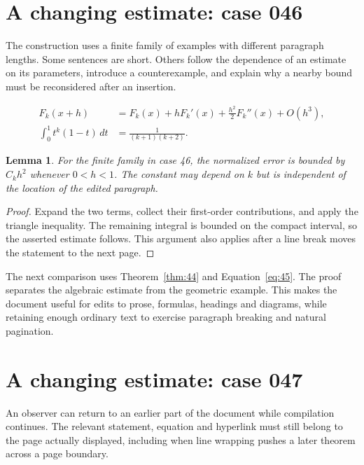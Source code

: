 \documentclass[a4paper,10pt]{article}
\newtheorem{lemma}[theorem]{Lemma}
\begin{document}
\lipsum[23]

\section{A changing estimate: case 046}\label{unit:45}
The construction uses a finite family of examples with different paragraph lengths. Some sentences are short. Others follow the dependence of an estimate on its parameters, introduce a counterexample, and explain why a nearby bound must be reconsidered after an insertion.

\lipsum[16-17]
\begin{align}\label{eq:45}
 F_k(x+h)&=F_k(x)+hF_k'(x)+\frac{h^2}{2}F_k''(x)+O(h^3),\\
 \int_0^1 t^k(1-t)\,dt&=\frac{1}{(k+1)(k+2)}.
\end{align}
\begin{lemma}\label{thm:45}
For the finite family in case 46, the normalized error is bounded by $C_k h^2$ whenever $0<h<1$. The constant may depend on $k$ but is independent of the location of the edited paragraph.
\end{lemma}
\begin{proof}
Expand the two terms, collect their first-order contributions, and apply the
triangle inequality. The remaining integral is bounded on the compact interval,
so the asserted estimate follows. This argument also applies after a line break
moves the statement to the next page.
\end{proof}
\begin{center}
\end{center}
The next comparison uses Theorem~\ref{thm:44} and Equation~\ref{eq:45}. The proof separates the algebraic estimate from the geometric example. This makes the document useful for edits to prose, formulas, headings and diagrams, while retaining enough ordinary text to exercise paragraph breaking and natural pagination.

\lipsum[3]

\section{A changing estimate: case 047}\label{unit:46}
An observer can return to an earlier part of the document while compilation continues. The relevant statement, equation and hyperlink must still belong to the page actually displayed, including when line wrapping pushes a later theorem across a page boundary.
\end{document}
